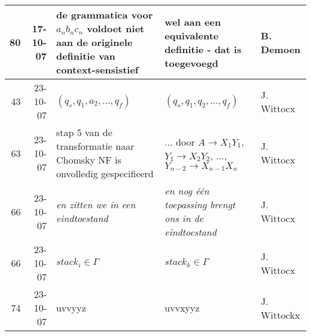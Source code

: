 \documentclass[11pt]{fund}
\begin{document}
\begin{tabular}{|r|r|p{6cm}|p{6cm}|p{2cm}|}
80 & 17-10-07 & de grammatica voor $a_nb_nc_n$ voldoet niet aan de originele definitie van context-sensistief   & wel aan een equivalente definitie - dat is toegevoegd & B. Demoen    \\
\hline

43 &
23-10-07 &
$(q_s,q_1,a_2,...,q_f)$ &
$(q_s,q_1,q_2,...,q_f)$ &
J. Wittocx \\ \hline

63 &
23-10-07 &
stap 5 van de transformatie naar Chomsky NF is onvolledig gespecifieerd &
... door $A \rightarrow X_1Y_1$, $Y_1 \rightarrow X_2Y_2$, ...,
$Y_{n-2} \rightarrow X_{n-1}X_n$ &
J. Wittocx \\ \hline

66 &
23-10-07 &
{\em en zitten we in een eindtoestand} &
{\em en nog \'{e}\'{e}n toepassing brengt ons in de eindtoestand} &
J. Wittocx \\ \hline

66 &
23-10-07 &
$stack_i \in \Gamma$ &
$stack_k \in \Gamma$ &
J. Wittocx \\ \hline

74 &
23-10-07 &
uvvyyz &
uvvxyyz &
J. Wittockx \\ \hline \hline
\end{tabular}
\end{document}
